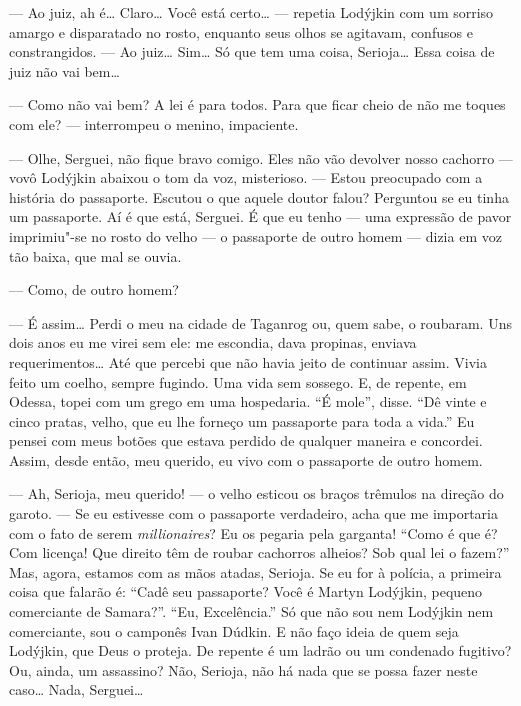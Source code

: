 --- Ao juiz, ah é\ldots{} Claro\ldots{} Você está certo\ldots{} --- repetia Lodýjkin
com um sorriso amargo e disparatado no rosto, enquanto seus olhos se
agitavam, confusos e constrangidos. --- Ao juiz\ldots{} Sim\ldots{} Só que tem uma
coisa, Serioja\ldots{} Essa coisa de juiz não vai bem\ldots{}

--- Como não vai bem? A lei é para todos. Para que ficar cheio de não me
toques com ele? --- interrompeu o menino, impaciente.

--- Olhe, Serguei, não fique bravo comigo. Eles não vão devolver nosso
cachorro --- vovô Lodýjkin abaixou o tom da voz, misterioso. --- Estou
preocupado com a história do passaporte. Escutou o que aquele doutor
falou? Perguntou se eu tinha um passaporte. Aí é que está, Serguei. É
que eu tenho --- uma expressão de pavor imprimiu"-se no rosto do velho
--- o passaporte de outro homem --- dizia em voz tão baixa, que mal se
ouvia.

--- Como, de outro homem?

--- É assim\ldots{} Perdi o meu na cidade de Taganrog ou, quem sabe, o
roubaram. Uns dois anos eu me virei sem ele: me escondia, dava propinas,
enviava requerimentos\ldots{} Até que percebi que não havia jeito de
continuar assim. Vivia feito um coelho, sempre fugindo. Uma vida sem
sossego. E, de repente, em Odessa, topei com um grego em uma hospedaria.
``É mole'', disse. ``Dê vinte e cinco pratas, velho, que eu lhe forneço
um passaporte para toda a vida.'' Eu pensei com meus botões que estava
perdido de qualquer maneira e concordei. Assim, desde então, meu
querido, eu vivo com o passaporte de outro homem.


--- Ah, Serioja, meu querido! --- o velho esticou os braços trêmulos na
direção do garoto. --- Se eu estivesse com o passaporte verdadeiro, acha
que me importaria com o fato de serem \emph{millionaires}? Eu os pegaria
pela garganta! ``Como é que é? Com licença! Que direito têm de roubar
cachorros alheios? Sob qual lei o fazem?'' Mas, agora, estamos com as
mãos atadas, Serioja. Se eu for à polícia, a primeira coisa que falarão
é: ``Cadê seu passaporte? Você é Martyn Lodýjkin, pequeno comerciante de
Samara?''. ``Eu, Excelência.'' Só que não sou nem Lodýjkin nem
comerciante, sou o camponês Ivan Dúdkin. E não faço ideia de quem seja
Lodýjkin, que Deus o proteja. De repente é um ladrão ou um condenado
fugitivo? Ou, ainda, um assassino? Não, Serioja, não há nada que se
possa fazer neste caso\ldots{} Nada, Serguei\ldots{}

